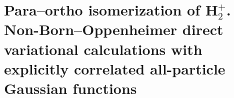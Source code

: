\chapter{Para–ortho isomerization of H$_2^+$. Non-Born–Oppenheimer direct variational calculations with explicitly correlated all-particle Gaussian functions\label{apndx10}}



